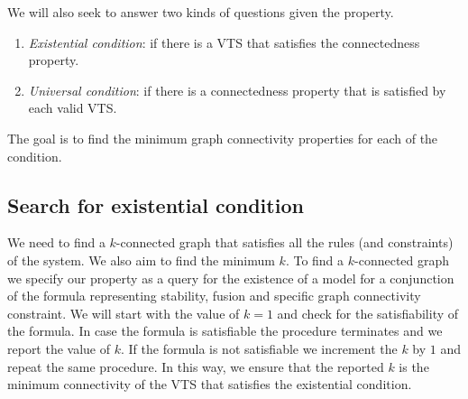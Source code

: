 \vspace{0.2cm}
\noindent We will also seek to answer two kinds of questions given the property.
\begin{enumerate}
\item {\em Existential condition}:
if there is a VTS that satisfies the connectedness property. 

\item {\em Universal condition}:
  if there is a connectedness property that is satisfied by each valid VTS.
\end{enumerate}
The goal is to find the minimum graph connectivity properties for each of the condition.
\subsection{Search for existential condition} 
%
%
We need to find a $k$-connected graph that satisfies all the rules (and constraints) of the system. 
%
We also aim to find the minimum $k$. 
%
%
To find a $k$-connected graph we specify our property as a query for the existence
of a model for a conjunction of the formula representing stability, fusion and specific
graph connectivity constraint. 
%
%
We will start with the value of $k = 1$ and check for the satisfiability of the formula.
%
In case the formula is satisfiable the procedure terminates and we report the value of $k$. 
%
If the formula is not satisfiable we increment the $k$ by $1$ and repeat the same procedure. 
%
In this way, we ensure that the reported $k$ is the minimum connectivity of the VTS that
satisfies the existential condition.
%

